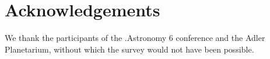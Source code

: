 \section{Acknowledgements}

We thank the participants of the .Astronomy 6 conference and the Adler Planetarium, without which the survey would not have been possible.